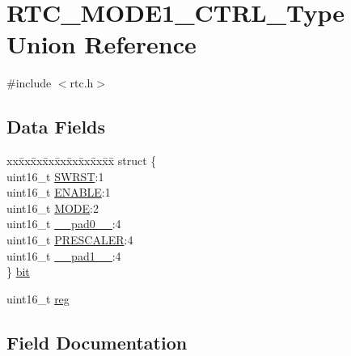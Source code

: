 \hypertarget{union_r_t_c___m_o_d_e1___c_t_r_l___type}{}\section{R\+T\+C\+\_\+\+M\+O\+D\+E1\+\_\+\+C\+T\+R\+L\+\_\+\+Type Union Reference}
\label{union_r_t_c___m_o_d_e1___c_t_r_l___type}


{\ttfamily \#include $<$rtc.\+h$>$}

\subsection*{Data Fields}
\begin{DoxyCompactItemize}
\item 
\begin{tabbing}
xx\=xx\=xx\=xx\=xx\=xx\=xx\=xx\=xx\=\kill
struct \{\\
\>uint16\_t \mbox{\hyperlink{union_r_t_c___m_o_d_e1___c_t_r_l___type_a4987fcca11694bd2ffae6a773a9bfc24}{SWRST}}:1\\
\>uint16\_t \mbox{\hyperlink{union_r_t_c___m_o_d_e1___c_t_r_l___type_aec203800ebef356dc04f3e8986a824d8}{ENABLE}}:1\\
\>uint16\_t \mbox{\hyperlink{union_r_t_c___m_o_d_e1___c_t_r_l___type_abd348ee828aadd0781f3fa97d167e564}{MODE}}:2\\
\>uint16\_t \mbox{\hyperlink{union_r_t_c___m_o_d_e1___c_t_r_l___type_a77132c2c26a75f5b8751b235cda23828}{\_\_pad0\_\_}}:4\\
\>uint16\_t \mbox{\hyperlink{union_r_t_c___m_o_d_e1___c_t_r_l___type_a30db59a1afd851a8a4acd5d8605ca6ba}{PRESCALER}}:4\\
\>uint16\_t \mbox{\hyperlink{union_r_t_c___m_o_d_e1___c_t_r_l___type_ab72e3a1f2f7db8695c60c658f5a0f11a}{\_\_pad1\_\_}}:4\\
\} \mbox{\hyperlink{union_r_t_c___m_o_d_e1___c_t_r_l___type_a4acdc345fd146e19969f3e7f513a58a6}{bit}}\\

\end{tabbing}\item 
uint16\+\_\+t \mbox{\hyperlink{union_r_t_c___m_o_d_e1___c_t_r_l___type_a11760f5020019f4aa8cb02e694f7cc44}{reg}}
\end{DoxyCompactItemize}


\subsection{Field Documentation}
\mbox{\label{union_r_t_c___m_o_d_e1___c_t_r_l___type_a77132c2c26a75f5b8751b235cda23828}} 
